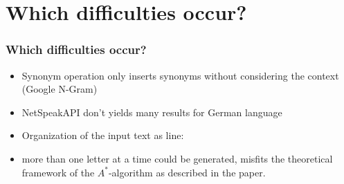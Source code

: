 \documentclass{beamer}
\begin{document}
\section{Which difficulties occur?}
\begin{frame}
\frametitle{Which difficulties occur?}
\begin{itemize}
	\item Synonym operation only inserts synonyms without considering
	the context (Google N-Gram)
	
	\item NetSpeakAPI don't yields many results for German language
	
	
	
	\item Organization of the input text as line:
		
		
		\item more than one letter at a time could be generated, misfits
		the theoretical framework of the $A^*$-algorithm as described in the paper.
	
	
	
	

	


		
	
	
	
\end{itemize}
\end{frame}
\end{document}
